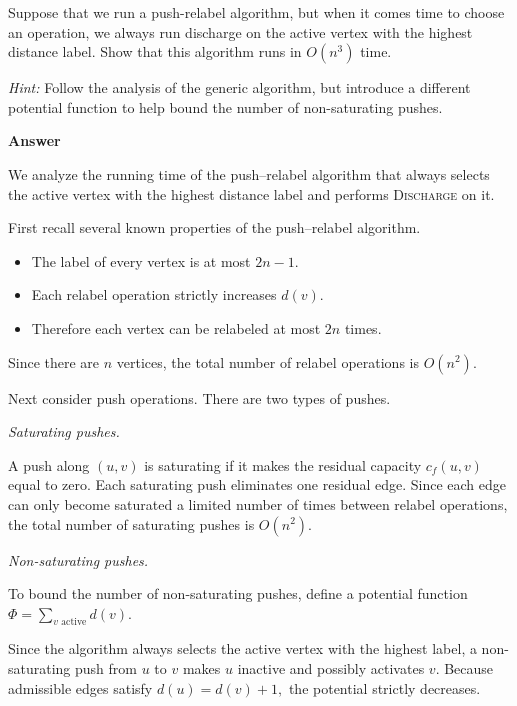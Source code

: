 \documentclass[letterpaper]{article}
\begin{document}
	\medskip
	
	Suppose that we run a push-relabel algorithm, but when it comes time to choose
	an operation, we always run discharge on the active vertex with the highest
	distance label. Show that this algorithm runs in $O(n^3)$ time.
	
	\medskip
	
	\emph{Hint:} Follow the analysis of the generic algorithm, but introduce a
	different potential function to help bound the number of non-saturating pushes.
	
		\textbf{Answer}
		
		We analyze the running time of the push--relabel algorithm that always
		selects the active vertex with the highest distance label and performs
		\textsc{Discharge} on it.
		
		\medskip
		
		First recall several known properties of the push--relabel algorithm.
		
		\begin{itemize}
			\item The label of every vertex is at most $2n-1$.
			\item Each relabel operation strictly increases $d(v)$.
			\item Therefore each vertex can be relabeled at most $2n$ times.
		\end{itemize}
		
		Since there are $n$ vertices, the total number of relabel operations is
		$O(n^2).$
		
		\medskip
		
		Next consider push operations. There are two types of pushes.
		
		\medskip
		
		\textit{Saturating pushes.}
		
		A push along $(u,v)$ is saturating if it makes the residual capacity
		$c_f(u,v)$ equal to zero. Each saturating push eliminates one residual
		edge. Since each edge can only become saturated a limited number of
		times between relabel operations, the total number of saturating pushes
		is
		$O(n^2).$
		
		\medskip
		
		\textit{Non-saturating pushes.}
		
		To bound the number of non-saturating pushes, define a potential function
		$
		\Phi = \sum_{v \text{ active}} d(v).
		$
		
		Since the algorithm always selects the active vertex with the highest
		label, a non-saturating push from $u$ to $v$ makes $u$ inactive and
		possibly activates $v$. Because admissible edges satisfy
		$d(u) = d(v) + 1,$
		the potential strictly decreases.
		
\end{document}
